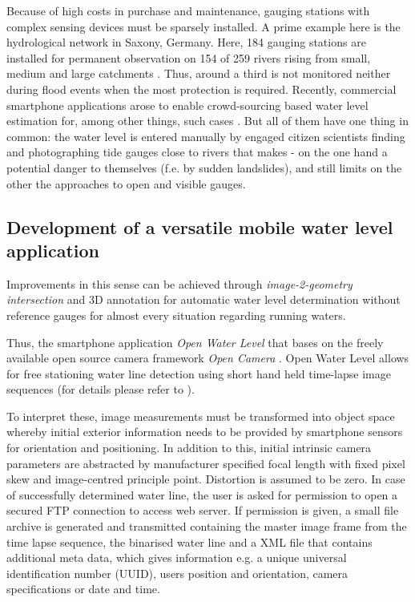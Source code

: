 \documentclass[review]{elsarticle}
\begin{document}
Because of high costs in purchase and maintenance, gauging stations with complex sensing devices must be sparsely installed. A prime example here is the hydrological network in Saxony, Germany. Here, 184 gauging stations are installed for permanent observation on 154 of 259 rivers rising from small, medium and large catchments \cite{Saxon2018, Buettner2015}. Thus, around a third is not monitored neither during flood events when the most protection is required. Recently, commercial smartphone applications arose to enable crowd-sourcing based water level estimation for, among other things, such cases \cite{CrowdWaterApp2017a, Kisters2014}. But all of them have one thing in common: the water level is entered manually by engaged citizen scientists finding and photographing tide gauges close to rivers that makes - on the one hand a potential danger to themselves (f.e. by sudden landslides), and still limits on the other the approaches to open and visible gauges.

\subsection{Development of a versatile mobile water level application}
\label{sec:water_level_gauging_approach}
Improvements in this sense can be achieved through \textit{image-2-geometry intersection} and 3D annotation for automatic water level determination without reference gauges for almost every situation regarding running waters. 

Thus, the smartphone application \textit{Open Water Level} that bases on the freely available open source camera framework \textit{Open Camera} \cite{Harman2017}. Open Water Level allows for free stationing water line detection using short hand held time-lapse image sequences (for details please refer to \cite{Kroehnert2017}). 

To interpret these, image measurements must be transformed into object space whereby initial exterior information needs to be provided by smartphone sensors for orientation and positioning. In addition to this, initial intrinsic camera parameters are abstracted by manufacturer specified focal length with fixed pixel skew and image-centred principle point. Distortion is assumed to be zero. In case of successfully determined water line, the user is asked for permission to open a secured FTP connection to access web server. If permission is given, a small file archive is generated and transmitted containing the master image frame from the time lapse sequence, the binarised water line and a XML file that contains additional meta data, which gives information e.g. a unique universal identification number (UUID), users position and orientation, camera specifications or date and time.
\end{document}
